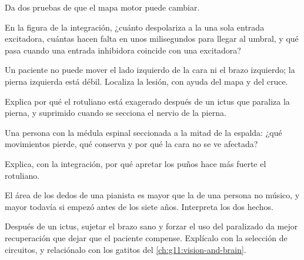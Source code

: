\begin{exercise}[$\star$]\label{exo:g12:brain-and-movement:5}
Da dos pruebas de que el mapa motor puede cambiar.
\end{exercise}

\begin{exercise}[$\star\star$]\label{exo:g12:brain-and-movement:6}
En la figura de la integración, ¿cuánto despolariza a la  una
sola entrada excitadora, cuántas hacen falta en unos milisegundos para
llegar al umbral, y qué pasa cuando una entrada inhibidora coincide con
una excitadora?
\end{exercise}

\begin{exercise}[$\star\star$]\label{exo:g12:brain-and-movement:7}
Un paciente no puede mover el lado izquierdo de la cara ni el brazo
izquierdo; la pierna izquierda está débil. Localiza la lesión, con
ayuda del mapa y del cruce.
\end{exercise}

\begin{exercise}[$\star\star$]\label{exo:g12:brain-and-movement:8}
Explica por qué el  rotuliano está exagerado después de un ictus
que paraliza la pierna, y suprimido cuando se secciona el nervio de la
pierna.
\end{exercise}

\begin{exercise}[$\star\star$]\label{exo:g12:brain-and-movement:9}
Una persona con la médula espinal seccionada a la mitad de la espalda:
¿qué movimientos pierde, qué  conserva y por qué la cara no se
ve afectada?
\end{exercise}

\begin{exercise}[$\star\star$]\label{exo:g12:brain-and-movement:10}
Explica, con la integración, por qué apretar los puños hace más fuerte
el  rotuliano.
\end{exercise}

\begin{exercise}[$\star\star$]\label{exo:g12:brain-and-movement:11}
El área de los dedos de una pianista es mayor que la de una persona no
músico, y mayor todavía si empezó antes de los siete años. Interpreta
los dos hechos.
\end{exercise}

\begin{exercise}[$\star\star\star$]\label{exo:g12:brain-and-movement:12}
Después de un ictus, sujetar el brazo sano y forzar el uso del
paralizado da mejor recuperación que dejar que el paciente compense.
Explícalo con la selección de circuitos, y relaciónalo con los gatitos
del \cref{ch:g11:vision-and-brain}.
\end{exercise}

